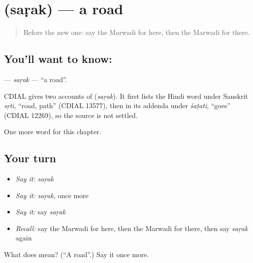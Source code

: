 \section[\texorpdfstring{\mw{सड़क} (saṛak)}{सड़क (saṛak)}]{ (saṛak) — a road}

\label{lesson:MW-C82-sarak}



\begin{quote}
Before the new one: say the Marwadi for here, then the Marwadi for there.
\end{quote}

\subsection*{You'll want to know: }
\textbf{} — \emph{saṛak} — \textquotedblleft{}a road\textquotedblright{}.

\begin{cousinweb}
CDIAL gives two accounts of \textbf{} (\emph{saṛak}). It first lists the Hindi word under Sanskrit \emph{sṛti}, \textquotedblleft{}road, path\textquotedblright{} (CDIAL 13577), then in its addenda under \emph{śaṭati}, \textquotedblleft{}goes\textquotedblright{} (CDIAL 12269), so the source is not settled.
\end{cousinweb}

\begin{grammarlens}[title={What you've built}]
One more word for this chapter.
\end{grammarlens}

\subsection*{Your turn}
\begin{itemize}
\raggedright
  \item \emph{Say it:} \emph{saṛak}
  \item \emph{Say it:} \emph{saṛak}, once more
  \item \emph{Say it:} say \emph{saṛak}
  \item \emph{Recall:} say the Marwadi for here, then the Marwadi for there, then say \emph{saṛak} again
\end{itemize}

\begin{tcolorbox}[breakable,colback=teal!4,colframe=teal!35!black,title={Before you move on}]
What does  mean? (\textquotedblleft{}A road\textquotedblright{}.) Say it once more.
\end{tcolorbox}
